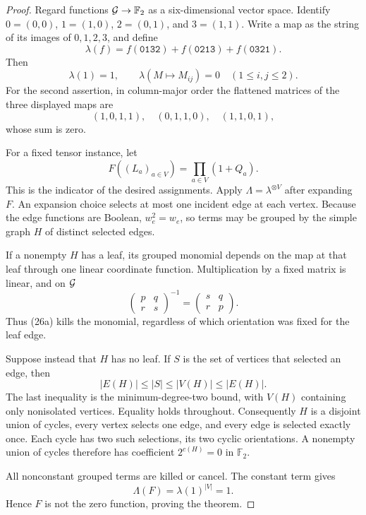 \documentclass[11pt]{article}
\theoremstyle{definition}
\theoremstyle{remark}
\newcommand{\F}{\mathbb F}
\begin{document}
\begin{proof}
Regard functions \({\cal G}\to\F_2\) as a six-dimensional vector space.
Identify \(0=(0,0)\), \(1=(1,0)\), \(2=(0,1)\), and \(3=(1,1)\).
Write a map as the string of its images of \(0,1,2,3\), and define
\[
 \lambda(f)=f(\texttt{0132})+f(\texttt{0213})+
            f(\texttt{0321}).
\]
Then
\[
 \lambda(1)=1,\qquad
 \lambda(M\mapsto M_{ij})=0\quad(1\le i,j\le2).          \tag{26a}
\]
For the second assertion, in column-major order the flattened matrices
of the three displayed maps are
\[
 (1,0,1,1),\quad(0,1,1,0),\quad(1,1,0,1),
\]
whose sum is zero.

For a fixed tensor instance, let
\[
                    F((L_a)_{a\in V})=\prod_{a\in V}(1+Q_a).
\]
This is the indicator of the desired assignments.  Apply
\(\Lambda=\lambda^{\otimes V}\) after expanding \(F\).  An expansion
choice selects at most one incident edge at each vertex.  Because the
edge functions are Boolean, \(w_e^2=w_e\), so terms may be grouped by
the simple graph \(H\) of distinct selected edges.

If a nonempty \(H\) has a leaf, its grouped monomial depends on the map
at that leaf through one linear coordinate function.  Multiplication by
a fixed matrix is linear, and on \({\cal G}\)
\[
 \begin{pmatrix}p&q\\r&s\end{pmatrix}^{-1}
 =\begin{pmatrix}s&q\\r&p\end{pmatrix}.
\]
Thus (26a) kills the monomial, regardless of which orientation was fixed
for the leaf edge.

Suppose instead that \(H\) has no leaf.  If \(S\) is the set of vertices
that selected an edge, then
\[
 |E(H)|\le |S|\le |V(H)|\le |E(H)|.
\]
The last inequality is the minimum-degree-two bound, with \(V(H)\)
containing only nonisolated vertices.  Equality holds throughout.
Consequently \(H\) is a disjoint union of cycles, every vertex selects
one edge, and every edge is selected exactly once.  Each cycle has two
such selections, its two cyclic orientations.  A nonempty union of
cycles therefore has coefficient \(2^{c(H)}=0\) in \(\F_2\).

All nonconstant grouped terms are killed or cancel.  The constant term
gives
\[
                         \Lambda(F)=\lambda(1)^{|V|}=1.
\]
Hence \(F\) is not the zero function, proving the theorem.
\end{proof}
\end{document}

